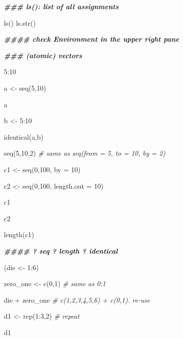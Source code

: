 \documentclass[
]{article}
\newenvironment{Shaded}{\begin{snugshade}}{\end{snugshade}}
\newcommand{\AttributeTok}[1]{\textcolor[rgb]{0.77,0.63,0.00}{#1}}
\newcommand{\CommentTok}[1]{\textcolor[rgb]{0.56,0.35,0.01}{\textit{#1}}}
\newcommand{\DecValTok}[1]{\textcolor[rgb]{0.00,0.00,0.81}{#1}}
\newcommand{\DocumentationTok}[1]{\textcolor[rgb]{0.56,0.35,0.01}{\textbf{\textit{#1}}}}
\newcommand{\FunctionTok}[1]{\textcolor[rgb]{0.00,0.00,0.00}{#1}}
\newcommand{\NormalTok}[1]{#1}
\newcommand{\OtherTok}[1]{\textcolor[rgb]{0.56,0.35,0.01}{#1}}
\newcommand{\SpecialCharTok}[1]{\textcolor[rgb]{0.00,0.00,0.00}{#1}}
\begin{document}
\begin{Shaded}
\begin{Highlighting}[]
\DocumentationTok{\#\#\# ls(): list of all assignments}

\FunctionTok{ls}\NormalTok{()}
\FunctionTok{ls.str}\NormalTok{()}

\DocumentationTok{\#\#\#\# check Environment in the upper right pane}

\DocumentationTok{\#\#\# (atomic) vectors}

\DecValTok{5}\SpecialCharTok{:}\DecValTok{10}

\NormalTok{a }\OtherTok{\textless{}{-}} \FunctionTok{seq}\NormalTok{(}\DecValTok{5}\NormalTok{,}\DecValTok{10}\NormalTok{)}

\NormalTok{a}

\NormalTok{b }\OtherTok{\textless{}{-}} \DecValTok{5}\SpecialCharTok{:}\DecValTok{10}

\FunctionTok{identical}\NormalTok{(a,b)}

\FunctionTok{seq}\NormalTok{(}\DecValTok{5}\NormalTok{,}\DecValTok{10}\NormalTok{,}\DecValTok{2}\NormalTok{) }\CommentTok{\# same as seq(from = 5, to = 10, by = 2)}

\NormalTok{c1 }\OtherTok{\textless{}{-}} \FunctionTok{seq}\NormalTok{(}\DecValTok{0}\NormalTok{,}\DecValTok{100}\NormalTok{, }\AttributeTok{by =} \DecValTok{10}\NormalTok{)}

\NormalTok{c2 }\OtherTok{\textless{}{-}} \FunctionTok{seq}\NormalTok{(}\DecValTok{0}\NormalTok{,}\DecValTok{100}\NormalTok{, }\AttributeTok{length.out =} \DecValTok{10}\NormalTok{)}

\NormalTok{c1}

\NormalTok{c2}

\FunctionTok{length}\NormalTok{(c1)}

\DocumentationTok{\#\#\#\# ? seq   ? length   ? identical}

\NormalTok{(die }\OtherTok{\textless{}{-}} \DecValTok{1}\SpecialCharTok{:}\DecValTok{6}\NormalTok{)}

\NormalTok{zero\_one }\OtherTok{\textless{}{-}} \FunctionTok{c}\NormalTok{(}\DecValTok{0}\NormalTok{,}\DecValTok{1}\NormalTok{) }\CommentTok{\# same as 0:1}

\NormalTok{die }\SpecialCharTok{+}\NormalTok{ zero\_one }\CommentTok{\# c(1,2,3,4,5,6) + c(0,1). re{-}use}

\NormalTok{d1 }\OtherTok{\textless{}{-}} \FunctionTok{rep}\NormalTok{(}\DecValTok{1}\SpecialCharTok{:}\DecValTok{3}\NormalTok{,}\DecValTok{2}\NormalTok{) }\CommentTok{\# repeat}


\NormalTok{d1}


\end{Highlighting}
\end{Shaded}
\end{document}

